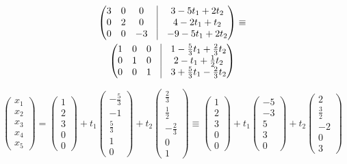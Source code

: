 \documentclass[12pt, a4paper]{article}
\begin{document}
\begin{multline}
\begin{pmatrix}
            3 & 0 & 0 & \vrule & 3 -5 t_1 + 2 t_2 \\
            0 & 2 & 0  & \vrule & 4 -2t_1 + t_2 \\
            0 & 0 & -3 & \vrule & -9 -5t_1 + 2t_2
        \end{pmatrix} \equiv \\ \begin{pmatrix}
            1 & 0 & 0 & \vrule & 1 -\frac53 t_1 + \frac23 t_2 \\
            0 & 1 & 0  & \vrule & 2 -t_1 + \frac12 t_2 \\
            0 & 0 & 1 & \vrule & 3 + \frac53 t_1 - \frac23 t_2
        \end{pmatrix}
    \end{multline}

    \begin{equation}
        \begin{pmatrix}
            x_1 \\ x_2 \\ x_3 \\ x_4 \\ x_5
        \end{pmatrix} = \begin{pmatrix}
            1 \\ 2 \\ 3 \\ 0 \\ 0
        \end{pmatrix} + t_1 \begin{pmatrix}
            -\frac53 \\ -1 \\ \frac53 \\ 1 \\ 0
        \end{pmatrix} + t_2 \begin{pmatrix}
            \frac23 \\ \frac12 \\ -\frac23 \\ 0 \\ 1
        \end{pmatrix} \equiv \begin{pmatrix}
            1 \\ 2 \\ 3 \\ 0 \\ 0
        \end{pmatrix} + t_1 \begin{pmatrix}
            -5 \\ -3 \\ 5 \\ 3 \\ 0
        \end{pmatrix} + t_2 \begin{pmatrix}
            2 \\ \frac32 \\ -2 \\ 0 \\ 3
        \end{pmatrix}
    \end{equation}
\end{document}
